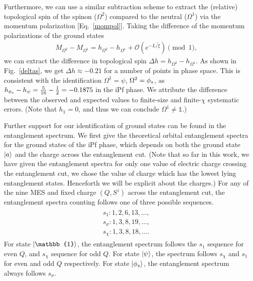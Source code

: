 Furthermore, we can use a similar subtraction scheme to extract the (relative) topological spin of the spinon ($\Omega^2$) compared to the neutral ($\Omega^1$) via the momentum polarization [Eq.~\eqref{mompol}].
Taking the difference of the momentum polarizations of the ground states
\begin{align}
	M_{\Omega^2} - M_{\Omega^1} = h_{\Omega^2} - h_{\Omega^1} + \mathcal{O}(e^{-L/\tilde{\xi}}) \pmod{1} ,
\end{align}
we can extract the difference in topological spin $\Delta h = h_{\Omega^2} - h_{\Omega^1}$.
As shown in Fig.~\ref{deltas}, we get $\Delta h \approx -0.21$ for a number of points in phase space.
This is consistent with the identification $\Omega^1 = \psi$, $\Omega^2 = {\phi_s}$, as $h_{\phi_s} - h_\psi = \frac{5}{16} - \frac{1}{2}  = -0.1875$ in the iPf phase. We attribute the difference between the observed and expected values to finite-size and finite-$\chi$ systematic errors.
(Note that $h_{\mathbb{1}} = 0$, and thus we can conclude $\Omega^1 \neq \mathbb{1}$.)


Further support for our identification of ground states can be found in the entanglement spectrum.
We first give the theoretical orbital entanglement spectra for the ground states of the iPf phase, which depends on both the ground state $\ket{a}$ and the charge across the entanglement cut.
(Note that so far in this work, we have given the entanglement spectra for only one value of electric charge crossing the entanglement cut, we chose the value of charge which has the lowest lying entanglement states.  Henceforth we will be explicit about the charges.)
For any of the nine MES and fixed charge $(Q,S^z)$ across the entanglement cut, the entanglement spectra counting follows one of three possible sequences.
\begin{align}\begin{split}
	s_1: 1, 2, 6, 13, \dots,
\\	s_\sigma: 1, 3, 8, 19, \dots,
\\	s_\chi: 1, 3, 8, 18, \dots.
\end{split}\end{align}
For state $\ket{\mathbb{1}}$, the entanglement spectrum follows the $s_1$ sequence for even $Q$, and $s_\chi$ sequence for odd $Q$.
For state $\ket{\psi}$, the spectrum follows $s_\chi$ and $s_1$ for even and odd $Q$ respectively.
For state $\ket{{\phi_s}}$, the entanglement spectrum always follows $s_\sigma$.



